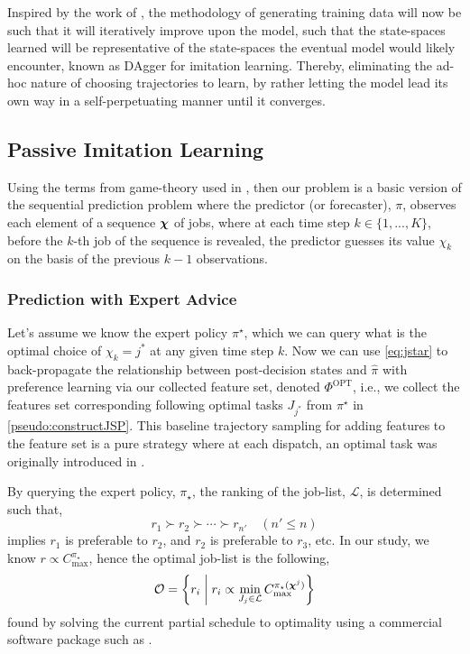 \documentclass[smallextended]{svjour3}
\begin{document}
Inspired by the work of \cite{RossB10,RossGB11}, the methodology of generating 
training data will now be such that it will iteratively improve upon the model, 
such that the state-spaces learned will be representative of the state-spaces 
the eventual model would likely encounter, known as DAgger for imitation 
learning.
Thereby, eliminating the ad-hoc nature of choosing trajectories to learn, by 
rather letting the model lead its own way in a self-perpetuating manner until 
it converges.

\subsection{Passive Imitation Learning}\label{sec:il:passive}
Using the terms from game-theory used in \cite{CesaBianchi06}, %
then our problem is a basic version of the sequential prediction problem where 
the predictor (or forecaster), $\pi$, observes each element of a sequence 
$\bm \chi$ of jobs, where at each time step $k \in \{1,...,K\}$, before the 
$k$-th job of the sequence is revealed, the predictor guesses its value 
$\chi_k$ on the basis of the previous $k-1$ observations. 

\subsubsection{Prediction with Expert Advice}\label{sec:expertPolicy}
Let's assume we know the expert policy $\pi^\star$, which we can query what 
is the optimal choice of $\chi_k={j^*}$ at any given time step $k$. 
Now we can use \cref{eq:jstar} to back-propagate the relationship between 
post-decision states and $\hat{\pi}$ with preference learning via our collected 
feature set, denoted $\Phi^\text{OPT}$, i.e., we collect the features set 
corresponding following optimal tasks $J_{j^*}$ from $\pi^\star$ in 
\cref{pseudo:constructJSP}.
This baseline trajectory sampling for adding features to the feature set 
is a pure strategy where at each dispatch, an optimal task was originally 
introduced in \cite{InRu11a}.

By querying the expert policy, $\pi_\star$, the ranking of the job-list, 
$\mathcal{L}$, is determined such that,
\begin{equation}
r_1 \succ r_2 \succ \cdots \succ r_{n'} \quad (n' \leq n)
\end{equation}
implies $r_1$  is preferable to $r_2$, and $r_2$ is preferable to $r_3$, etc. 
In  our study, we know $r \propto C_{\max}^{\pi_\star}$, hence the optimal 
job-list is the following, 
\begin{equation}
\mathcal{O}=\left\{r_i\;\middle|\;r_i \propto \min_{J_j \in \mathcal{L}} 
  C_{\max}^{\pi_\star(\bm \chi^j)}\right\}
\end{equation}
found by solving the current partial schedule to optimality using a 
commercial software package such as \cite{gurobi}. 
\end{document}
